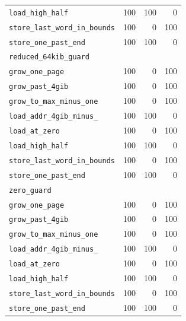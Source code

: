 {\begin{longtable}{lrrr}
\quad \texttt{load\_\allowbreak high\_\allowbreak half} & 100 & 100 & 0 \\
\quad \texttt{store\_\allowbreak last\_\allowbreak word\_\allowbreak in\_\allowbreak bounds} & 100 & 0 & 100 \\
\quad \texttt{store\_\allowbreak one\_\allowbreak past\_\allowbreak end} & 100 & 100 & 0 \\
\midrule
\multicolumn{4}{l}{\texttt{reduced\_\allowbreak 64kib\_\allowbreak guard}} \\
\quad \texttt{grow\_\allowbreak one\_\allowbreak page} & 100 & 0 & 100 \\
\quad \texttt{grow\_\allowbreak past\_\allowbreak 4gib} & 100 & 0 & 100 \\
\quad \texttt{grow\_\allowbreak to\_\allowbreak max\_\allowbreak minus\_\allowbreak one} & 100 & 0 & 100 \\
\quad \texttt{load\_\allowbreak addr\_\allowbreak 4gib\_\allowbreak minus\_\allowbreak 4} & 100 & 100 & 0 \\
\quad \texttt{load\_\allowbreak at\_\allowbreak zero} & 100 & 0 & 100 \\
\quad \texttt{load\_\allowbreak high\_\allowbreak half} & 100 & 100 & 0 \\
\quad \texttt{store\_\allowbreak last\_\allowbreak word\_\allowbreak in\_\allowbreak bounds} & 100 & 0 & 100 \\
\quad \texttt{store\_\allowbreak one\_\allowbreak past\_\allowbreak end} & 100 & 100 & 0 \\
\midrule
\multicolumn{4}{l}{\texttt{zero\_\allowbreak guard}} \\
\quad \texttt{grow\_\allowbreak one\_\allowbreak page} & 100 & 0 & 100 \\
\quad \texttt{grow\_\allowbreak past\_\allowbreak 4gib} & 100 & 0 & 100 \\
\quad \texttt{grow\_\allowbreak to\_\allowbreak max\_\allowbreak minus\_\allowbreak one} & 100 & 0 & 100 \\
\quad \texttt{load\_\allowbreak addr\_\allowbreak 4gib\_\allowbreak minus\_\allowbreak 4} & 100 & 100 & 0 \\
\quad \texttt{load\_\allowbreak at\_\allowbreak zero} & 100 & 0 & 100 \\
\quad \texttt{load\_\allowbreak high\_\allowbreak half} & 100 & 100 & 0 \\
\quad \texttt{store\_\allowbreak last\_\allowbreak word\_\allowbreak in\_\allowbreak bounds} & 100 & 0 & 100 \\
\quad \texttt{store\_\allowbreak one\_\allowbreak past\_\allowbreak end} & 100 & 100 & 0 \\

\end{longtable}}
